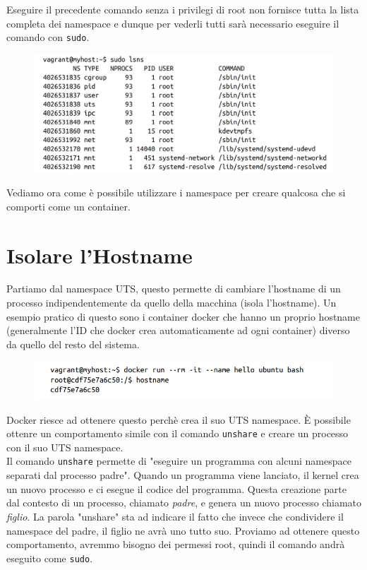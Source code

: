 Eseguire il precedente comando senza i privilegi di root non fornisce tutta la lista
completa dei namespace e dunque per vederli tutti sarà necessario eseguire il comando
con \verb|sudo|.

\begin{figure}[H]
    \centering
    \includegraphics[width=\textwidth, keepaspectratio]{capitoli/os_security/imgs/namespace2.png}
\end{figure}

Vediamo ora come è possibile utilizzare i namespace per creare qualcosa che si
comporti come un container.

\section{Isolare l'Hostname}

Partiamo dal namespace UTS, questo permette di cambiare l'hostname di un processo
indipendentemente da quello della macchina (isola l'hostname).
Un esempio pratico di questo sono i container docker che hanno un proprio hostname
(generalmente l'ID che docker crea automaticamente ad ogni container) diverso da
quello del resto del sistema.

\begin{figure}[H]
    \centering
    \includegraphics[width=\textwidth, keepaspectratio]{capitoli/os_security/imgs/hostname1.png}
\end{figure}

Docker riesce ad ottenere questo perchè crea il suo UTS namespace.
È possibile ottenre un comportamento simile con il comando \verb|unshare| e creare
un processo con il suo UTS namespace.\\

Il comando \verb|unshare| permette di "eseguire un programma con alcuni namespace
separati dal processo padre". Quando un programma viene lanciato, il kernel crea un
nuovo processo e ci esegue il codice del programma. Questa creazione parte dal
contesto di un processo, chiamato \textit{padre}, e
genera un nuovo processo chiamato \textit{figlio}. La parola "unshare" sta ad indicare
il fatto che invece che condividere il namespace del padre, il figlio ne avrà uno tutto suo.
Proviamo ad ottenere questo comportamento, avremmo bisogno dei permessi root,
quindi il comando andrà eseguito come \verb|sudo|.

